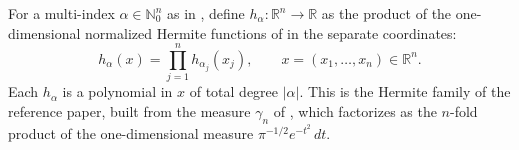 \begin{definition}
For a multi-index $\alpha \in \mathbb{N}_0^n$ as in , define
$h_\alpha : \mathbb{R}^n \to \mathbb{R}$ as the product of the one-dimensional
normalized Hermite functions of  in the separate coordinates:
\[
  h_\alpha(x) = \prod_{j=1}^n h_{\alpha_j}(x_j),
  \qquad x = (x_1,\ldots,x_n) \in \mathbb{R}^n .
\]
Each $h_\alpha$ is a polynomial in $x$ of total degree $|\alpha|$.  This is the
Hermite family of the reference paper, built from the measure $\gamma_n$ of
, which factorizes as the $n$-fold product of the
one-dimensional measure $\pi^{-1/2} e^{-t^2}\,dt$.
\end{definition}
